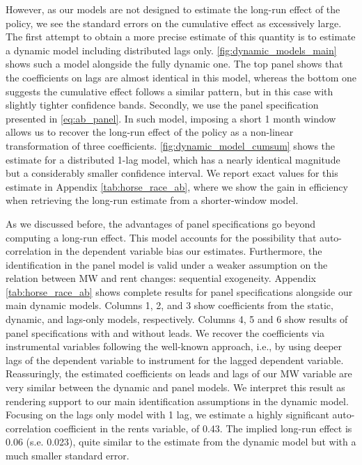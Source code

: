 However, as our models are not designed to estimate the long-run effect of the policy, we see 
the standard errors on the cumulative effect as excessively large. The first attempt to obtain 
a more precise estimate of this quantity is to estimate a dynamic model including distributed 
lags only. \autoref{fig:dynamic_models_main} shows such a model alongside the fully dynamic one. 
The top panel shows that the coefficients on lags are almost identical in this model, whereas 
the bottom one suggests the cumulative effect follows a similar pattern, but in this case with 
slightly tighter confidence bands. Secondly, we use the panel specification presented in 
\autoref{eq:ab_panel}. In such model, imposing a short 1 month window allows us to recover 
the long-run effect of the policy as a non-linear transformation of three coefficients. 
\autoref{fig:dynamic_model_cumsum} shows the estimate for a distributed 1-lag model, 
which has a nearly identical magnitude but a considerably smaller confidence interval. We report 
exact values for this estimate in Appendix \autoref{tab:horse_race_ab}, where we show the gain 
in efficiency when retrieving the long-run estimate from a shorter-window model. 

As we discussed before, the advantages of panel specifications go beyond computing a long-run 
effect. This model accounts for the possibility that auto-correlation in the dependent variable 
bias our estimates. Furthermore, the identification in the panel model is valid under a weaker 
assumption on the relation between MW and rent changes: sequential exogeneity. Appendix 
\autoref{tab:horse_race_ab} shows complete results for panel specifications alongside our main 
dynamic models. Columns 1, 2, and 3 show coefficients from the static, dynamic, and lags-only 
models, respectively. Columns 4, 5 and 6 show results of panel specifications with and without 
leads. We recover the coefficients via instrumental variables following the well-known 
\textcite{ArellanoBond1991} approach, i.e., by using deeper lags of the dependent variable to 
instrument for the lagged dependent variable. Reassuringly, the estimated coefficients on leads 
and lags of our MW variable are very similar between the dynamic and panel models. We interpret 
this result as rendering support to our main identification assumptions in the dynamic model. 
Focusing on the lags only model with 1 lag, we estimate a highly significant auto-correlation 
coefficient in the rents variable, of 0.43. The implied long-run effect is 0.06 (s.e. 0.023), 
quite similar to the estimate from the dynamic model but with a much smaller standard error.


